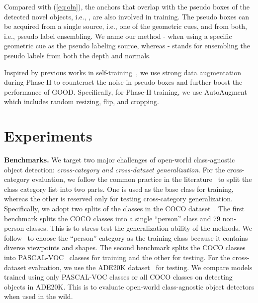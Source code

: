 \documentclass{article} \usepackage{iclr2023_conference,times}
\begin{document}
Compared with (\ref{eq:oln}), the anchors that overlap with the pseudo boxes of the detected novel objects, i.e., , are also involved in training. 
The pseudo boxes can be acquired from a single source, i.e., one of the geometric cues, and from both, i.e., pseudo label ensembling. We name our method - when using a specific geometric cue  as the pseudo labeling source, whereas - stands for ensembling the pseudo labels from both the depth and normals. 


Inspired by previous works in self-training~\citep{xie2020self, sohn2020fixmatch, xu2021softteacher}, we use strong data augmentation during Phase-II to counteract the noise in pseudo boxes and further boost the performance of GOOD.  
Specifically, for Phase-II training, we use AutoAugment~\citep{cubuk2019autoaugment} which includes random resizing, flip, and cropping. 



 



\section{Experiments}
\textbf{Benchmarks.}
We target two major challenges of open-world class-agnostic object detection: \textit{cross-category and cross-dataset generalization}. 
For the cross-category evaluation, we follow the common practice in the literature~\citep{kim_learning_2021,wang2022open} to split the class category list into two parts. One is used as the base class for training, whereas the other is reserved only for testing cross-category generalization. Specifically, we adopt two splits of the  classes in the COCO dataset~\citep{CoCodataset}.
The first benchmark splits the COCO classes into a single ``person'' class and 79 non-person classes. This is to stress-test the generalization ability of the methods. We follow~\cite{wang2022open} to choose the ``person'' category as the training class because it contains diverse viewpoints and shapes. The second benchmark splits the COCO classes into  PASCAL-VOC~\citep{Everingham10} classes for training and the other  for testing. 
For the cross-dataset evaluation, we use the ADE20K dataset~\citep{zhou2019semantic} for testing. We compare models trained using only  PASCAL-VOC classes or all  COCO classes on detecting objects in ADE20K.
This is to evaluate open-world class-agnostic object detectors when used in the wild.
\end{document}
